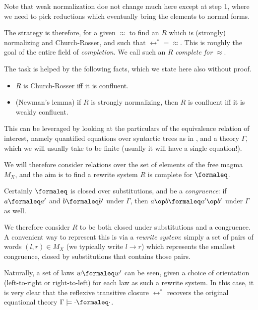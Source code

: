 Note that weak normalization doe not change much here except at step 1, where we need to pick reductions which eventually bring the elements to normal forms.

The strategy is therefore, for a given $\approx$ to find an $R$ which is (strongly) normalizing and Church-Rosser, and such that $\leftrightarrow^* = \approx$. This is roughly the goal of the entire field of \emph{completion}. We call such an $R$ \emph{complete for} $\approx$.

The task is helped by the following facts, which we state here also without proof.

\begin{theorem}
  \begin{itemize}
  \item $R$ is Church-Rosser iff it is confluent.
  \item (Newman's lemma) if $R$ is strongly normalizing, then $R$ is confluent iff it is weakly confluent.
  \end{itemize}
\end{theorem}

This can be leveraged by looking at the particulars of the equivalence relation of interest, namely quantified equations over syntactic trees as in , and a theory $\Gamma$, which we will usually take to be finite (usually it will have a single equation!).

We will therefore consider relations over the set of elements of the free magma $M_{X}$, and the aim is to find a rewrite system $R$ is complete for $\formaleq$.

Certainly $\formaleq$ is closed over substitutions, and be a \emph{congruence}: if $a\formaleq a'$ and $b\formaleq b'$ under $\Gamma$, then $a\op b\formaleq a'\op b'$ under $\Gamma$ as well.

We therefore consider $R$ to be both closed under substitutions and a congruence. A convenient way to represent this is via a \emph{rewrite system}: simply a set of pairs of words $(l, r) \in M_{X}$ (we typically write $l\rightarrow r$) which represents the smallest congruence, closed by substitutions that contains those pairs.

Naturally, a set of laws $w \formaleq w'$ can be seen, given a choice of orientation (left-to-right or right-to-left) for each law as such a rewrite system. In this case, it is very clear that the reflexive transitive closure $\leftrightarrow^*$ recovers the original equational theory $\Gamma\models \cdot\formaleq\cdot$.
